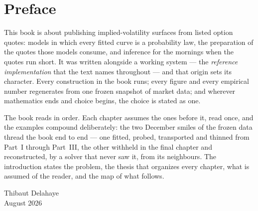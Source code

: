 \chapter*{Preface}

This book is about publishing implied-volatility surfaces from listed
option quotes: models in which every fitted curve is a probability
law, the preparation of the quotes those models consume, and
inference for the mornings when the quotes run short.  It was written
alongside a working system --- the \emph{reference implementation}
that the text names throughout --- and that origin sets its
character.  Every construction in the book runs; every figure and
every empirical number regenerates from one frozen snapshot of market
data; and wherever mathematics ends and choice begins, the choice is
stated as one.

The book reads in order.  Each chapter assumes the ones before it,
read once, and the examples compound deliberately: the two December
smiles of the frozen data thread the book end to end --- one fitted,
probed, transported and thinned from Part~I through Part~III, the
other withheld in the final chapter and reconstructed, by a solver
that never saw it, from its neighbours.  The
introduction states the problem, the thesis that organizes every
chapter, what is assumed of the reader, and the map of what follows.

\vspace{2\baselineskip}
\begin{flushright}
Thibaut Delahaye\\
August 2026
\end{flushright}
